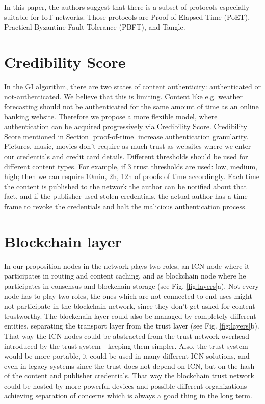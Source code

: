 In this paper, the authors suggest that there is a subset of protocols especially suitable for IoT networks. Those protocols are Proof of Elapsed Time (PoET), Practical Byzantine Fault Tolerance (PBFT), and Tangle.

\section{Credibility Score}
In the GI algorithm, there are two states of content authenticity: authenticated or not-authenticated. We believe that this is limiting. Content like e.g. weather forecasting should not be authenticated for the same amount of time as an online banking website. Therefore we propose a more flexible model, where authentication can be acquired progressively via Credibility Score. Credibility Score mentioned in Section \ref{proof-of-time} increase authentication granularity. Pictures, music, movies don't require as much trust as websites where we enter our credentials and credit card details. Different thresholds should be used for different content types. For example, if 3 trust thresholds are used: low, medium, high; then we can require 10min, 2h, 12h of proofs of time accordingly. Each time the content is published to the network the author can be notified about that fact, and if the publisher used stolen credentials, the actual author has a time frame to revoke the credentials and halt the malicious authentication process.

\section{Blockchain layer}
In our proposition nodes in the network plays two roles, an ICN node where it participates in routing and content caching, and as blockchain node where he participates in consensus and blockchain storage (see Fig. \ref{fig:layers}a). Not every node has to play two roles, the ones which are not connected to end-uses might not participate in the blockchain network, since they don't get asked for content trustworthy. 
The blockchain layer could also be managed by completely different entities, separating the transport layer from the trust layer (see Fig. \ref{fig:layers}b). That way the ICN nodes could be abstracted from the trust network overhead introduced by the trust system––keeping them simpler. Also, the trust system would be more portable, it could be used in many different ICN solutions, and even in legacy systems since the trust does not depend on ICN, but on the hash of the content and publisher credentials. That way the blockchain trust network could be hosted by more powerful devices and possible different organizations––achieving separation of concerns which is always a good thing in the long term.


